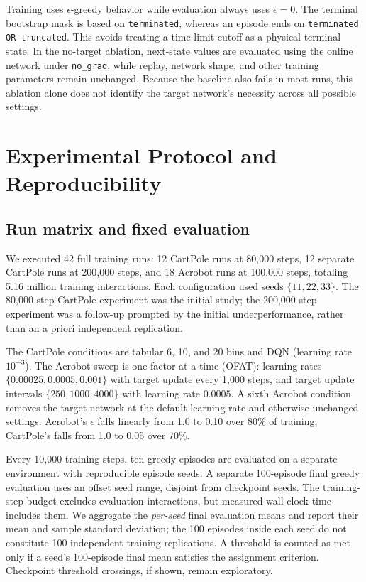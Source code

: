 \documentclass[conference,10pt]{IEEEtran}
\begin{document}
Training uses $\epsilon$-greedy behavior while evaluation always uses $\epsilon=0$. The terminal bootstrap mask is based on \texttt{terminated}, whereas an episode ends on \texttt{terminated OR truncated}. This avoids treating a time-limit cutoff as a physical terminal state. In the no-target ablation, next-state values are evaluated using the online network under \texttt{no\_grad}, while replay, network shape, and other training parameters remain unchanged. Because the baseline also fails in most runs, this ablation alone does not identify the target network's necessity across all possible settings.

\section{Experimental Protocol and Reproducibility}
\subsection{Run matrix and fixed evaluation}
We executed 42 full training runs: 12 CartPole runs at 80,000 steps, 12 separate CartPole runs at 200,000 steps, and 18 Acrobot runs at 100,000 steps, totaling 5.16 million training interactions. Each configuration used seeds $\{11,22,33\}$. The 80,000-step CartPole experiment was the initial study; the 200,000-step experiment was a follow-up prompted by the initial underperformance, rather than an a priori independent replication.

The CartPole conditions are tabular 6, 10, and 20 bins and DQN (learning rate $10^{-3}$). The Acrobot sweep is one-factor-at-a-time (OFAT): learning rates $\{0.00025,0.0005,0.001\}$ with target update every 1,000 steps, and target update intervals $\{250,1000,4000\}$ with learning rate $0.0005$. A sixth Acrobot condition removes the target network at the default learning rate and otherwise unchanged settings. Acrobot's $\epsilon$ falls linearly from 1.0 to 0.10 over 80\% of training; CartPole's falls from 1.0 to 0.05 over 70\%.

Every 10,000 training steps, ten greedy episodes are evaluated on a separate environment with reproducible episode seeds. A separate 100-episode final greedy evaluation uses an offset seed range, disjoint from checkpoint seeds. The training-step budget excludes evaluation interactions, but measured wall-clock time includes them. We aggregate the \emph{per-seed} final evaluation means and report their mean and sample standard deviation; the 100 episodes inside each seed do not constitute 100 independent training replications. A threshold is counted as met only if a seed's 100-episode final mean satisfies the assignment criterion. Checkpoint threshold crossings, if shown, remain exploratory.
\end{document}
